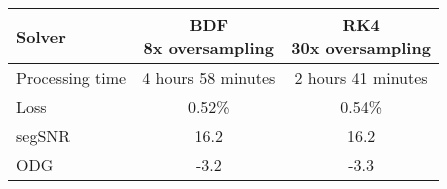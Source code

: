 \begin{tabular}{@{} l|c c @{}}
    \toprule
    Solver & \makecell{\acs{BDF}\\8x oversampling} & \makecell{\acs{RK}4\\30x oversampling} \\ \midrule
    Processing time & 4 hours 58 minutes & 2 hours 41 minutes \\ \midrule
    Loss   & 0.52\% & 0.54\% \\
    segSNR & 16.2 & 16.2 \\
    ODG    & -3.2 & -3.3 \\ \bottomrule
\end{tabular}%
